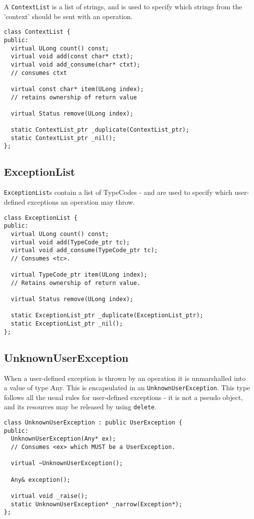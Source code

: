 \documentclass[11pt,twoside,onecolumn]{book}
\begin{document}
A {\tt ContextList} is a list of strings, and is used to specify which
strings from the 'context' should be sent with an operation.

{\small \begin{verbatim}
class ContextList {
public:
  virtual ULong count() const;
  virtual void add(const char* ctxt);
  virtual void add_consume(char* ctxt);
  // consumes ctxt

  virtual const char* item(ULong index);
  // retains ownership of return value

  virtual Status remove(ULong index);

  static ContextList_ptr _duplicate(ContextList_ptr);
  static ContextList_ptr _nil();
};
\end{verbatim}}


\subsection{ExceptionList}

{\tt ExceptionList}s contain a list of TypeCodes - and are used to specify
which user-defined exceptions an operation may throw.

{\small \begin{verbatim}
class ExceptionList {
public:
  virtual ULong count() const;
  virtual void add(TypeCode_ptr tc);
  virtual void add_consume(TypeCode_ptr tc);
  // Consumes <tc>.

  virtual TypeCode_ptr item(ULong index);
  // Retains ownership of return value.

  virtual Status remove(ULong index);

  static ExceptionList_ptr _duplicate(ExceptionList_ptr);
  static ExceptionList_ptr _nil();
};
\end{verbatim}}


\subsection{UnknownUserException}

When a user-defined exception is thrown by an operation it is unmarshalled
into a value of type Any. This is encapsulated in an
{\tt UnknownUserException}. This type follows all the usual rules for
user-defined exceptions - it is not a pseudo object, and its resources may
be released by using {\tt delete}.

{\small \begin{verbatim}
class UnknownUserException : public UserException {
public:
  UnknownUserException(Any* ex);
  // Consumes <ex> which MUST be a UserException.

  virtual ~UnknownUserException();

  Any& exception();

  virtual void _raise();
  static UnknownUserException* _narrow(Exception*);
};
\end{verbatim}}
\end{document}
